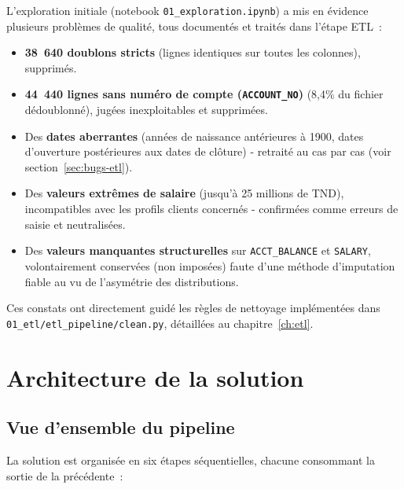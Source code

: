 \documentclass[11pt,a4paper]{report}
\begin{document}
L'exploration initiale (notebook \texttt{01\_exploration.ipynb}) a mis en
\'evidence plusieurs probl\`emes de qualit\'e, tous document\'es et trait\'es dans
l'\'etape ETL~:

\begin{itemize}
\item \textbf{38~640 doublons stricts} (lignes identiques sur toutes les
      colonnes), supprim\'es.
\item \textbf{44~440 lignes sans num\'ero de compte (\texttt{ACCOUNT\_NO})}
      (8,4\% du fichier d\'edoublonn\'e), jug\'ees inexploitables et supprim\'ees.
\item Des \textbf{dates aberrantes} (ann\'ees de naissance ant\'erieures \`a
      1900, dates d'ouverture post\'erieures aux dates de cl\^oture) - retrait\'e
      au cas par cas (voir section~\ref{sec:bugs-etl}).
\item Des \textbf{valeurs extr\^emes de salaire} (jusqu'\`a 25 millions de
      TND), incompatibles avec les profils clients concern\'es - confirm\'ees
      comme erreurs de saisie et neutralis\'ees.
\item Des \textbf{valeurs manquantes structurelles} sur \texttt{ACCT\_BALANCE}
      et \texttt{SALARY}, volontairement conserv\'ees (non impos\'ees) faute
      d'une m\'ethode d'imputation fiable au vu de l'asym\'etrie des
      distributions.
\end{itemize}

Ces constats ont directement guid\'e les r\`egles de nettoyage impl\'ement\'ees
dans \texttt{01\_etl/etl\_pipeline/clean.py}, d\'etaill\'ees au
chapitre~\ref{ch:etl}.

\chapter{Architecture de la solution}
\label{ch:architecture}

\section{Vue d'ensemble du pipeline}

La solution est organis\'ee en six \'etapes s\'equentielles, chacune consommant
la sortie de la pr\'ec\'edente~:
\end{document}

